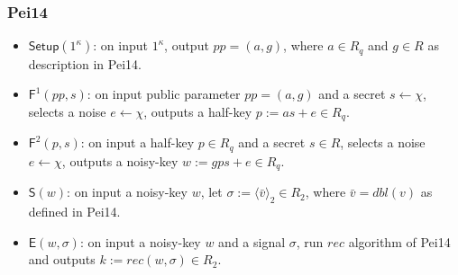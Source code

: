 \subsubsection{Pei14}
\begin{itemize}
\item $\mathsf{Setup}(1^\kappa)$: on input $1^\kappa$, output $pp=(a, g)$, where $a\in R_q$ and $g\in R$ as description in Pei14.

\item $\mathsf{F}^1(pp,s)$: on input public parameter $pp=(a,g)$ and a secret $s\leftarrow \chi $, selects a noise $e\leftarrow \chi$, outputs a half-key $p:= as +e \in R_q$.

\item $\mathsf{F}^2(p, s)$: on input a half-key $p\in R_q$ and a secret $s\in R$, selects a noise $e\leftarrow \chi$, outputs a noisy-key $w:= gps+e \in R_q$.

\item $\mathsf{S}(w)$: on input a noisy-key $w$, let $\sigma:=\langle \bar{v}\rangle_2\in R_2$, where $\bar{v}=dbl(v)$ as defined in Pei14.

\item $\mathsf{E}(w,\sigma)$: on input a noisy-key $w$ and a signal $\sigma$, run $rec$ algorithm of Pei14 and outputs $k:= rec(w,\sigma) \in R_2$. 
\end{itemize}	



